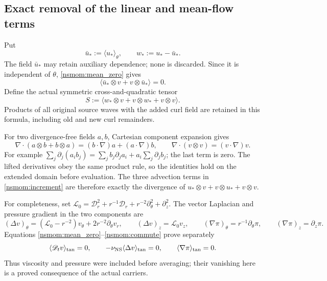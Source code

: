 \subsection{Exact removal of the linear and mean-flow terms}
\label{nsmom:linear}
Put
\[
 \bar u_*:=\langle u_*\rangle_\theta,
 \qquad w_*:=u_*-\bar u_*.
\]
The field $\bar u_*$ may retain auxiliary dependence; none is discarded.
Since it is independent of $\theta$, \eqref{nsmom:mean_zero} gives
\[
 \langle\bar u_*\otimes v+v\otimes\bar u_*\rangle=0.
\]
Define the actual symmetric cross-and-quadratic tensor
\begin{equation}
 S:=\langle w_*\otimes v+v\otimes w_*+v\otimes v\rangle.
 \label{nsmom:stress}
\end{equation}
Products of all original source waves with the added curl field are
retained in this formula, including old and new curl remainders.

For two divergence-free fields $a,b$, Cartesian component expansion
gives
\[
 \nabla\cdot(a\otimes b+b\otimes a)
 =(b\cdot\nabla)a+(a\cdot\nabla)b,
 \qquad\nabla\cdot(v\otimes v)=(v\cdot\nabla)v.
\]
For example
$\sum_j\partial_j(a_i b_j)=\sum_jb_j\partial_ja_i+
a_i\sum_j\partial_jb_j$; the last term is zero. The lifted derivatives
obey the same product rule, so the identities hold on the extended
domain before evaluation. The three advection terms in
\eqref{nsmom:increment} are therefore exactly the divergence of
$u_*\otimes v+v\otimes u_*+v\otimes v$.

For completeness, set
$\mathscr L_0=\mathscr D_r^2+r^{-1}\mathscr D_r+
r^{-2}\partial_\theta^2+\partial_z^2$.
The vector Laplacian and pressure gradient in the two components are
\[
 (\Delta v)_\theta=(\mathscr L_0-r^{-2})v_\theta
                       +2r^{-2}\partial_\theta v_r,
 \qquad(\Delta v)_z=\mathscr L_0v_z,
 \qquad(\nabla\pi)_\theta=r^{-1}\partial_\theta\pi,
 \qquad(\nabla\pi)_z=\partial_z\pi.
\]
Equations \eqref{nsmom:mean_zero}--\eqref{nsmom:commute} prove separately
\begin{equation}
 \langle\mathscr D_t v\rangle_{\rm tan}=0,
 \qquad -\nu_{\rm NS}\langle\Delta v\rangle_{\rm tan}=0,
 \qquad\langle\nabla\pi\rangle_{\rm tan}=0.
 \label{nsmom:linear_zero}
\end{equation}
Thus viscosity and pressure were included before averaging; their
vanishing here is a proved consequence of the actual carriers.

